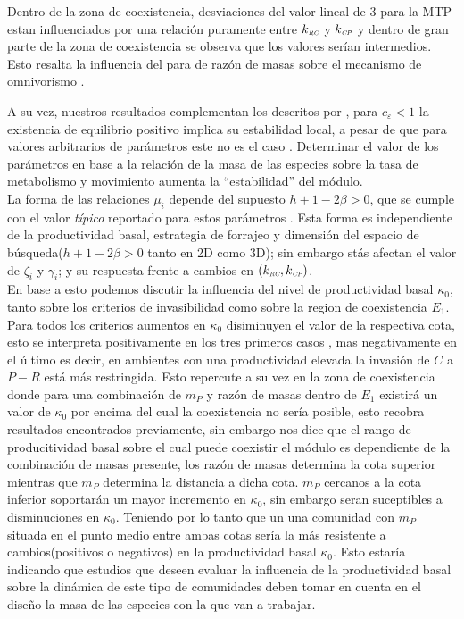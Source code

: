 Dentro de la zona de coexistencia, desviaciones del valor lineal de $3$ para la MTP estan influenciados por una relaci\'on puramente entre $k_{\textit{\tiny RC}}$ y $k_{\textit{\tiny CP}}$ y dentro de gran parte de la zona de coexistencia se observa que los valores ser\'ian intermedios. Esto resalta la influencia del para de raz\'on de masas sobre el mecanismo de omnivorismo \citet{TP2007proximate}.

A su vez, nuestros resultados complementan los descritos por \citet{brose2006allometric}, para $c_\varepsilon < 1$ la existencia de equilibrio positivo implica su estabilidad local, a pesar de que para valores arbitrarios de par\'ametros este no es el caso \citep{holt1997theoretical}. Determinar el valor de los par\'ametros en base a la relaci\'on de la masa de las especies sobre la tasa de metabolismo y movimiento aumenta la ``estabilidad'' del m\'odulo.\\

La forma de las relaciones $\mu_i$ depende del supuesto $ h + 1 - 2\beta > 0$, que se cumple con el valor \emph{t\'ipico} reportado para estos par\'ametros \citep{pawar2012dimensionality,brown2004toward}. Esta forma es independiente de la productividad basal, estrategia de forrajeo y dimensi\'on del espacio de b\'usqueda($h +1 - 2\beta > 0$ tanto en 2D como 3D); sin embargo st\'as afectan el valor de $\zeta_i$ y $\gamma_i$; y su respuesta frente a cambios en $(k_{\textit{\tiny RC}},k_{\textit{\tiny CP}})$.\\

En base a esto podemos discutir la influencia del nivel de productividad basal $\kappa_0$, tanto sobre los criterios de invasibilidad como sobre la region de coexistencia $E_1$. Para todos los criterios aumentos en $\kappa_0$ disiminuyen el valor de la respectiva cota, esto se interpreta positivamente en los tres primeros casos , mas negativamente en el \'ultimo es decir, en ambientes con una productividad elevada la invasi\'on de $C$ a $P-R$ est\'a m\'as restringida. Esto repercute a su vez en la zona de coexistencia donde para una combinaci\'on de $m_P$ y raz\'on de masas dentro de $E_1$ existir\'a un valor de $\kappa_0$ por encima del cual la coexistencia no ser\'ia posible, esto recobra resultados encontrados previamente\citep{holt1997theoretical}, sin embargo nos dice que el rango de producitividad basal sobre el cual puede coexistir el m\'odulo es dependiente de la combinaci\'on de masas presente, los raz\'on de masas determina la cota superior mientras que $m_P$ determina la distancia a dicha cota. $m_P$ cercanos a la cota inferior soportar\'an un mayor incremento en $\kappa_0$, sin embargo seran suceptibles a disminuciones en $\kappa_0$. Teniendo por lo tanto que un una comunidad con $m_P$ situada en el punto medio entre ambas cotas ser\'ia la m\'as resistente a cambios(positivos o negativos) en la productividad basal $\kappa_0$. Esto estar\'ia indicando que estudios que deseen evaluar la influencia de la productividad basal sobre la din\'amica de este tipo de comunidades \citep{diehl2001intraguild,takimoto2007intraguild,TP2007proximate} deben tomar en cuenta en el dise\~no la masa de las especies con la que van a trabajar.\\


